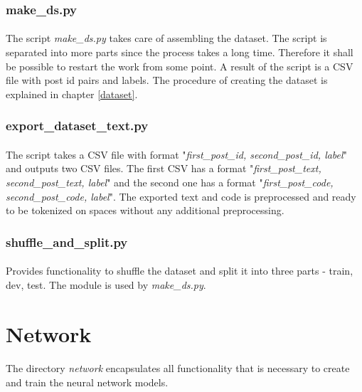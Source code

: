 \subsubsection{make\_ds.py}
\paragraph{}
The script \textit{make\_ds.py} takes care of assembling the dataset. The script is separated into more parts since the process takes a long time. Therefore it shall be possible to restart the work from some point. A result of the script is a CSV file with post id pairs and labels. The procedure of creating the dataset is explained in chapter \ref{dataset}.

\subsubsection{export\_dataset\_text.py}
\paragraph{}
The script takes a CSV file with format "\textit{first\_post\_id, second\_post\_id, label}" and outputs two CSV files. The first CSV has a format "\textit{first\_post\_text, second\_post\_text, label}" and the second one has a format "\textit{first\_post\_code, second\_post\_code, label}". The exported text and code is preprocessed and ready to be tokenized on spaces without any additional preprocessing.

\subsubsection{shuffle\_and\_split.py}
\paragraph{}
Provides functionality to shuffle the dataset and split it into three parts - train, dev, test. The module is used by \textit{make\_ds.py}.

\section{Network}
\paragraph{}
The directory \textit{network} encapsulates all functionality that is necessary to create and train the neural network models.

